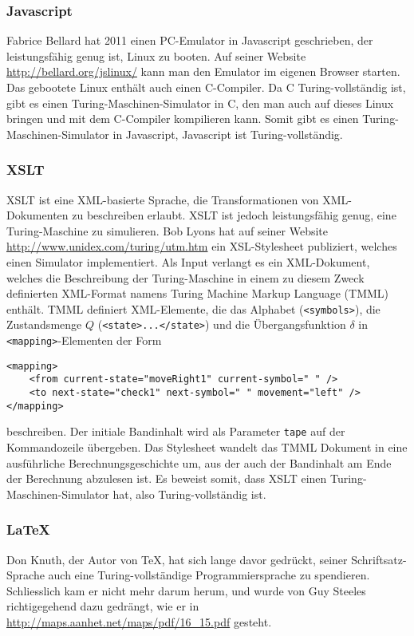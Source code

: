 \subsubsection{Javascript}
%
Fabrice Bellard hat 2011 einen PC-Emulator in Javascript geschrieben, der
leistungsfähig genug ist, Linux zu booten. Auf seiner Website
\url{http://bellard.org/jslinux/} kann man den Emulator im eigenen Browser
starten. Das gebootete Linux enthält auch einen C-Compiler. Da C
Turing-vollständig ist, gibt es einen Turing-Maschinen-Simulator in
C, den man auch auf dieses Linux bringen und mit dem C-Compiler
kompilieren kann. Somit gibt es einen Turing-Maschinen-Simulator in
Javascript, Javascript ist Turing-vollständig.

\subsubsection{XSLT}
%
XSLT ist eine XML-basierte Sprache, die Transformationen von XML-Dokumenten
zu beschreiben erlaubt. XSLT ist jedoch leistungsfähig genug, eine Turing-Maschine
zu simulieren. Bob Lyons hat auf seiner Website
\url{http://www.unidex.com/turing/utm.htm} ein XSL-Stylesheet publiziert,
welches einen Simulator implementiert. Als Input verlangt es
ein
XML-Dokument, welches die Beschreibung der Turing-Maschine in einem
zu diesem Zweck definierten XML-Format namens Turing Machine Markup
Language (TMML) enthält. TMML definiert XML-Elemente, die das Alphabet
(\verb+<symbols>+),
die Zustandsmenge $Q$ (\verb+<state>...</state>+)
und die Übergangsfunktion $\delta$ in \verb+<mapping>+-Elementen
der Form
\begin{verbatim}
<mapping>
    <from current-state="moveRight1" current-symbol=" " />
    <to next-state="check1" next-symbol=" " movement="left" />
</mapping>
\end{verbatim}
beschreiben. Der initiale Bandinhalt wird als Parameter \verb+tape+
auf der Kommandozeile übergeben.
Das Stylesheet wandelt das TMML Dokument in eine ausführliche
Berechnungsgeschichte um, aus der auch der Bandinhalt am Ende der Berechnung
abzulesen ist. Es beweist somit, dass XSLT einen Turing-Maschinen-Simulator
hat, also Turing-vollständig ist.

\subsubsection{\LaTeX}
%
%
Don Knuth, der Autor von \TeX, hat sich lange davor gedrückt, seiner
Schriftsatz-Sprache auch eine Turing-vollständige Programmiersprache
zu spendieren. Schliesslich kam er nicht mehr darum herum, und wurde
von Guy Steeles richtigegehend dazu gedrängt, wie er in
\url{http://maps.aanhet.net/maps/pdf/16\_15.pdf}
gesteht.

